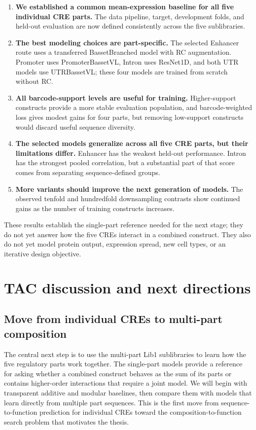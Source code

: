 \documentclass[11pt]{article}
\begin{document}
\begin{enumerate}
  \item \textbf{We established a common mean-expression baseline for all five
  individual CRE parts.} The data pipeline, target, development folds, and
  held-out evaluation are now defined consistently across the five
  sublibraries.
  \item \textbf{The best modeling choices are part-specific.} The selected
  Enhancer route uses a transferred BassetBranched model with RC augmentation.
  Promoter uses PromoterBassetVL, Intron uses ResNet1D, and both UTR models use
  UTRBassetVL; these four models are trained from scratch without RC.
  \item \textbf{All barcode-support levels are useful for training.}
  Higher-support constructs provide a more stable evaluation population, and
  barcode-weighted loss gives modest gains for four parts, but removing
  low-support constructs would discard useful sequence diversity.
  \item \textbf{The selected models generalize across all five CRE parts, but
  their limitations differ.} Enhancer has the weakest held-out performance.
  Intron has the strongest pooled correlation, but a substantial part of that
  score comes from separating sequence-defined groups.
  \item \textbf{More variants should improve the next generation of models.}
  The observed tenfold and hundredfold downsampling contrasts show continued
  gains as the number of training constructs increases.
\end{enumerate}

These results establish the single-part reference needed for the next stage;
they do not yet answer how the five CREs interact in a combined construct.
They also do not yet model protein output, expression spread, new cell types,
or an iterative design objective.

\section{TAC discussion and next directions}

\subsection{Move from individual CREs to multi-part composition}

The central next step is to use the multi-part Lib1 sublibraries to learn how
the five regulatory parts work together. The single-part models provide a
reference for asking whether a combined construct behaves as the sum of its
parts or contains higher-order interactions that require a joint model. We will
begin with transparent additive and modular baselines, then compare them with
models that learn directly from multiple part sequences. This is the first move
from sequence-to-function prediction for individual CREs toward the
composition-to-function search problem that motivates the thesis.
\end{document}
